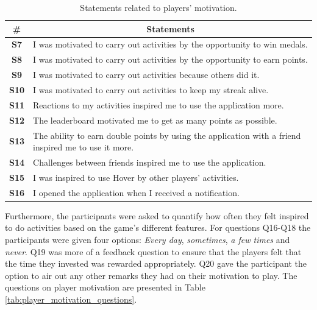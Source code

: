 \begin{table}[H]
    \centering
    \begin{tabularx}{\textwidth}{|c|X|}
        \hline
        \textbf{\#} & \multicolumn{1}{c|}{\textbf{Statements}} \\ \hline
        \textbf{S7} & I was motivated to carry out activities by the opportunity to win medals. \\
        \textbf{S8} & I was motivated to carry out activities by the opportunity to earn points. \\
        \textbf{S9} & I was motivated to carry out activities because others did it. \\
        \textbf{S10} & I was motivated to carry out activities to keep my streak alive. \\
        \textbf{S11} & Reactions to my activities inspired me to use the application more. \\
        \textbf{S12} & The leaderboard motivated me to get as many points as possible. \\
        \textbf{S13} & The ability to earn double points by using the application with a friend inspired me to use it more. \\
        \textbf{S14} & Challenges between friends inspired me to use the application. \\
        \textbf{S15} & I was inspired to use Hover by other players' activities. \\
        \textbf{S16} & I opened the application when I received a notification. \\ \hline
    \end{tabularx}
    \caption{Statements related to players' motivation.}
    \label{tab:player_motivation_statements}
\end{table}

Furthermore, the participants were asked to quantify how often they felt inspired to do activities based on the game’s different features. For questions Q16-Q18 the participants were given four options: \textit{Every day}, \textit{sometimes}, \textit{a few times} and \textit{never}. Q19 was more of a feedback question to ensure that the players felt that the time they invested was rewarded appropriately. Q20 gave the participant the option to air out any other remarks they had on their motivation to play. The questions on player motivation are presented in Table \ref{tab:player_motivation_questions}.

